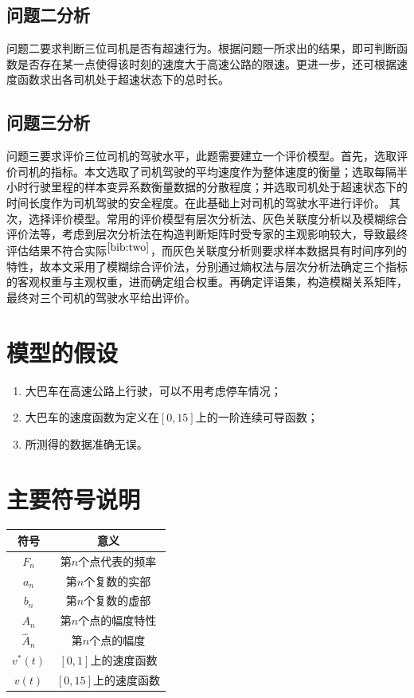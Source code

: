 \documentclass[bwprint]{cumcmthesis}
\begin{document}
        \subsection{问题二分析}
        问题二要求判断三位司机是否有超速行为。根据问题一所求出的结果，即可判断函数是否存在某一点使得该时刻的速度大于高速公路的限速。更进一步，还可根据速度函数求出各司机处于超速状态下的总时长。
        \subsection{问题三分析}
        问题三要求评价三位司机的驾驶水平，此题需要建立一个评价模型。首先，选取评价司机的指标。本文选取了司机驾驶的平均速度作为整体速度的衡量；选取每隔半小时行驶里程的样本变异系数衡量数据的分散程度；并选取司机处于超速状态下的时间长度作为司机驾驶的安全程度。在此基础上对司机的驾驶水平进行评价。
        其次，选择评价模型。常用的评价模型有层次分析法、灰色关联度分析以及模糊综合评价法等，考虑到层次分析法在构造判断矩阵时受专家的主观影响较大，导致最终评估结果不符合实际$^{\cite{bib:two}}$，而灰色关联度分析则要求样本数据具有时间序列的特性，故本文采用了模糊综合评价法，分别通过熵权法与层次分析法确定三个指标的客观权重与主观权重，进而确定组合权重。再确定评语集，构造模糊关系矩阵，最终对三个司机的驾驶水平给出评价。
    \section{模型的假设}
        \begin{enumerate}
            \item 大巴车在高速公路上行驶，可以不用考虑停车情况；
            \item 大巴车的速度函数为定义在$[0,15]$上的一阶连续可导函数；
            \item 所测得的数据准确无误。
        \end{enumerate}
    \section{主要符号说明}
        \begin{center}
            \begin{tabular}{cc}
                \hline
                符号	&  意义 \\ \hline
                $F_n$ & 第$n$个点代表的频率 \\ 
                $a_n$ & 第$n$个复数的实部 \\ 
                $b_n$ & 第$n$个复数的虚部 \\ 
                $A_n$ & 第$n$个点的幅度特性 \\ 
                $\widehat{A}_n$ & 第$n$个点的幅度 \\ 
                $v^*(t)$ & $[0,1]$上的速度函数 \\ 
                $v(t)$ & $[0,15]$上的速度函数 \\
                \hline
            \end{tabular}
        \end{center}
\end{document}

